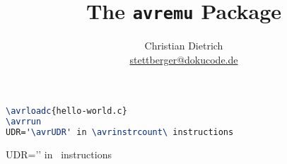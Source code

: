 \documentclass{article}
\title{The \texttt{avremu} Package}
\author{Christian Dietrich\\
\url{stettberger@dokucode.de}}
\begin{document}
\maketitle

\begin{tcolorbox}
  
  \tcblower
  \begin{lstlisting}[language=TeX]
\avrloadc{hello-world.c}
\avrrun
UDR='\avrUDR' in \avrinstrcount\ instructions
\end{lstlisting}
\end{tcolorbox}
\begin{tcolorbox}
\avrrun
UDR='\avrUDR' in \avrinstrcount\ instructions
\end{tcolorbox}
\end{document}
